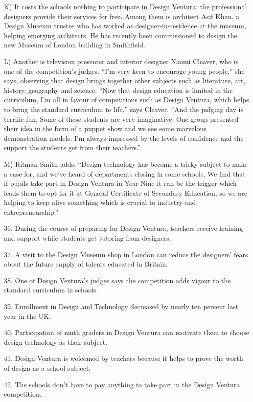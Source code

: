 \documentclass[UTF8,11pt]{ctexart}
\begin{document}
K) It costs the schools nothing to participate in Design Ventura; the professional designers provide their services for free. Among them is architect Asif Khan, a Design Museum trustee who has worked as designer-in-residence at the museum, helping emerging architects. He has recently been commissioned to design the new Museum of London building in Smithfield.


L) Another is television presenter and interior designer Naomi Cleaver, who is one of the competition’s judges. “I’m very keen to encourage young people,” she says, observing that design brings together other subjects such as literature, art, history, geography and science. “Now that design education is limited in the curriculum, I’m all in favour of competitions such as Design Ventura, which helps to bring the standard curriculum to life,” says Cleaver. “And the judging day is terrific fun. Some of these students are very imaginative. One group presented their idea in the form of a puppet show and we see some marvelous demonstration models. I’m always impressed by the levels of confidence and the support the students get from their teachers.”


M) Ritman Smith adds: “Design technology has become a tricky subject to make a case for, and we’ve heard of departments closing in some schools. We find that if pupils take part in Design Ventura in Year Nine it can be the trigger which leads them to opt for it at General Certificate of Secondary Education, so we are helping to keep alive something which is crucial to industry and entrepreneurship.”


36. During the course of preparing for Design Ventura, teachers receive training and support while students get tutoring from designers.


37. A visit to the Design Museum shop in London can reduce the designers’ fears about the future supply of talents educated in Britain.


38. One of Design Ventura’s judges says the competition adds vigour to the standard curriculum in schools.


39. Enrollment in Design and Technology decreased by nearly ten percent last year in the UK.


40. Participation of ninth graders in Design Ventura can motivate them to choose design technology as their subject.


41. Design Ventura is welcomed by teachers because it helps to prove the worth of design as a school subject.


42. The schools don’t have to pay anything to take part in the Design Ventura competition.
\end{document}
